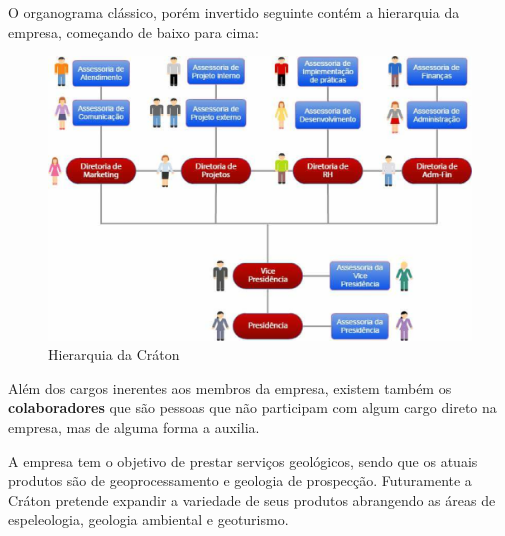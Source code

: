   O organograma clássico, porém invertido seguinte contém a hierarquia da empresa, começando
  de baixo para cima:

  \begin{figure}[!ht]
    \centering
    \includegraphics[width=15cm, keepaspectratio=true]{figuras/empresa/hierarquia-craton.eps}
    \caption{Hierarquia da Cráton}
  \end{figure}

  Além dos cargos inerentes aos membros da empresa, existem também os \textbf{colaboradores}
  que são pessoas que não participam com algum cargo direto na empresa, mas de alguma forma
  a auxilia.

  A empresa tem o objetivo de prestar serviços geológicos, sendo que os atuais produtos são
  de geoprocessamento e geologia de prospecção. Futuramente a Cráton pretende expandir a
  variedade de seus produtos abrangendo as áreas de espeleologia, geologia ambiental e
  geoturismo.

